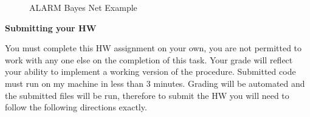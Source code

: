 \documentclass[12pt]{article}
\begin{document}
{	\begin{figure}
		\begin{center}
			\caption{ALARM Bayes Net Example}
			\label{ALARM}
		\end{center} 
	\end{figure} 
} 

{\bf Submitting your HW}

You must complete this HW assignment on your own, you are not permitted to work with any one else on the completion of this task.  Your grade will reflect your ability to implement a working version of the procedure.  Submitted code must run on my machine in less than 3 minutes.  Grading will be automated and the submitted files will be run, therefore to submit the HW you will need to follow the following directions exactly.
\end{document}
